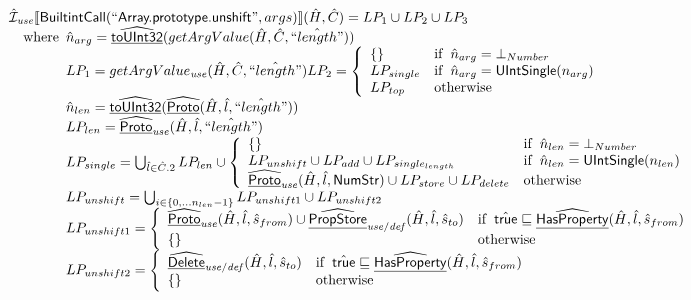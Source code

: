 \[
\begin{array}{l}

\hat{\mathcal{I}}_{\it use}\llbracket \mbox{\textsf{BuiltintCall}}(``\mbox{\textsf{Array.prototype.unshift}}",args)\rrbracket(\hat{H},\hat{C}) = LP_1 \cup LP_2 \cup LP_3\\
\quad{\rm where}\begin{array}[t]{l}
  \hat{n}_{arg} = \widehat{\underline{\sf toUInt32}}(getArgValue(\hat{H}, \hat{C}, \hat{``length"}))\\
  LP_1 = getArgValue_{\it use}(\hat{H}, \hat{C}, \hat{``length"})
  LP_2 = \left\{\begin{array}{ll}
      \left\{\begin{array}{l}\end{array}\right\} & {\rm if}\begin{array}[t]{l}\hat{n}_{arg} = \bot_{Number}\end{array}\\
      LP_{single} & {\rm if}\begin{array}[t]{l}\hat{n}_{arg} = \mbox{\textsf{UIntSingle}}(n_{arg})\end{array}\\
      LP_{top} & {\rm otherwise}
    \end{array}\right.\\
  \hat{n}_{len} = \widehat{\underline{\sf toUInt32}}(\widehat{\underline{\sf Proto}}(\hat{H}, \hat{l}, \hat{``length"}))\\
  LP_{len} =  \widehat{\underline{\sf Proto}}_{\it use}(\hat{H}, \hat{l}, \hat{``length"})\\
  LP_{single} = \bigcup_{\hat{l} \in \hat{C}.2}  LP_{len} \cup \left\{\begin{array}{ll}
      \left\{\begin{array}{l}\end{array}\right\} & {\rm if}\begin{array}[t]{l}\hat{n}_{len} = \bot_{Number}\end{array}\\
      LP_{unshift} \cup LP_{add} \cup LP_{single_{length}} & {\rm if}\begin{array}[t]{l}\hat{n}_{len} = \mbox{\textsf{UIntSingle}}(n_{len})\end{array}\\
     \widehat{\underline{\sf Proto}}_{\it use}(\hat{H}, \hat{l}, \mbox{\textsf{NumStr}}) \cup  LP_{store} \cup LP_{delete} & {\rm otherwise}
    \end{array}\right.\\
  LP_{unshift} = \bigcup_{i \in \{0,...n_{len}-1\} } LP_{unshift1} \cup LP_{unshift2}\\
  LP_{unshift1} = \left\{\begin{array}{ll}
      \widehat{\underline{\sf Proto}}_{\it use}(\hat{H}, \hat{l}, \hat{s}_{from}) \cup \widehat{\underline{\sf PropStore}}_{\it use/def}(\hat{H}, \hat{l}, \hat{s}_{to})
      & {\rm if}\begin{array}[t]{l}\hat{\mbox{\textsf{true}}} \sqsubseteq \widehat{\underline{\sf HasProperty}}(\hat{H}, \hat{l}, \hat{s}_{from})\end{array}\\
      \left\{\begin{array}{l}\end{array}\right\} & {\rm otherwise}
    \end{array}\right.\\
  LP_{unshift2} = \left\{\begin{array}{ll}
      \widehat{\underline{\sf Delete}}_{\it use/def}(\hat{H}, \hat{l}, \hat{s}_{to})
      & {\rm if}\begin{array}[t]{l}\hat{\mbox{\textsf{true}}} \sqsubseteq \widehat{\underline{\sf HasProperty}}(\hat{H}, \hat{l}, \hat{s}_{from})\end{array}\\
      \left\{\begin{array}{l}\end{array}\right\} & {\rm otherwise}
    \end{array}\right.\\
\end{array}
\end{array}\]
